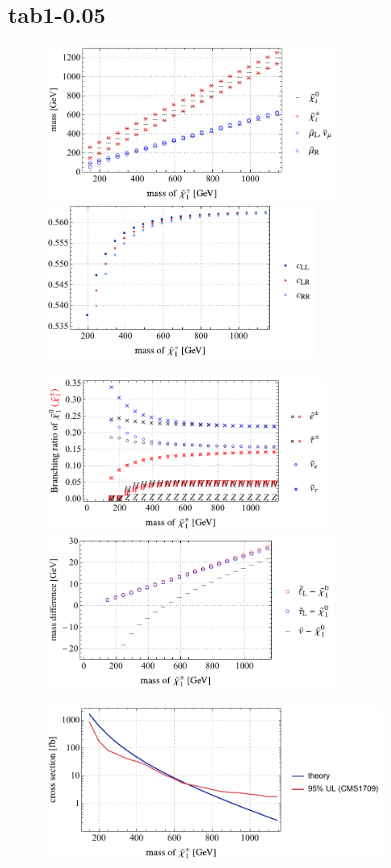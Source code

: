 \documentclass[a4paper,10pt,captions=tableheading,DIV=14]{scrartcl}
\numberwithin{equation}{section}
\begin{document}
\subsection{tab1-0.05}

\begin{figure}[h]
  \centering
  \includegraphics[height=115pt]{../plots/plot_tab1x005_mass.pdf}
  \includegraphics[height=115pt]{../plots/plot_tab1x005_cfactors.pdf}
\par
  \includegraphics[height=115pt]{../plots/plot_tab1x005_br21.pdf}
  \includegraphics[height=115pt]{../plots/plot_tab1x005_massdiff.pdf}
\par
  \includegraphics[height=115pt]{../plots/plot_tab1x005_limit.pdf}


\end{figure}
\end{document}
